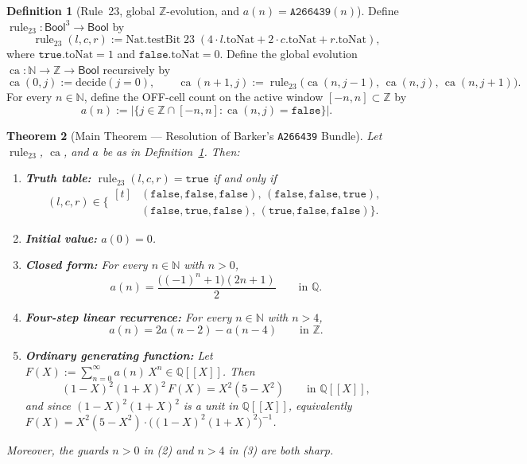 \documentclass[11pt]{article}
\newcommand{\llbracket}{[\![}
\newcommand{\rrbracket}{]\!]}
\newtheorem{theorem}{Theorem}[section]
\theoremstyle{definition}
\newtheorem{definition}[theorem]{Definition}
\newcommand{\N}{\mathbb{N}}
\newcommand{\Z}{\mathbb{Z}}
\newcommand{\Q}{\mathbb{Q}}
\newcommand{\seq}[1]{\texttt{#1}}
\newcommand{\ruleTT}{\operatorname{rule}_{23}}
\newcommand{\ca}{\operatorname{ca}}
\begin{document}
\begin{definition}[Rule~23, global $\Z$-evolution, and $a(n) = \seq{A266439}(n)$]
\label{def:c051}
Define $\ruleTT : \mathsf{Bool}^3 \to \mathsf{Bool}$ by
\[
\ruleTT(l, c, r) := \mathrm{Nat.testBit}\;23\;(4\cdot l.\mathrm{toNat} + 2\cdot c.\mathrm{toNat} + r.\mathrm{toNat}),
\]
where $\mathtt{true}.\mathrm{toNat} = 1$ and $\mathtt{false}.\mathrm{toNat} = 0$. Define the global evolution $\ca : \N \to \Z \to \mathsf{Bool}$ recursively by
\[
\ca(0, j) := \mathrm{decide}(j = 0), \qquad
\ca(n + 1, j) := \ruleTT\bigl(\ca(n, j - 1),\, \ca(n, j),\, \ca(n, j + 1)\bigr).
\]
For every $n \in \N$, define the OFF-cell count on the active window $[-n, n] \subset \Z$ by
\[
a(n) := \bigl|\{j \in \Z \cap [-n, n] : \ca(n, j) = \mathtt{false}\}\bigr|.
\]
\end{definition}

\begin{theorem}[Main Theorem --- Resolution of Barker's \seq{A266439} Bundle]
\label{thm:main}
Let $\ruleTT$, $\ca$, and $a$ be as in Definition~\ref{def:c051}. Then:
\begin{enumerate}
\item[\textup{(0)}] \textbf{Truth table:} $\ruleTT(l, c, r) = \mathtt{true}$ if and only if
\[
(l, c, r) \in \bigl\{\begin{aligned}[t]
&(\mathtt{false},\mathtt{false},\mathtt{false}),\, (\mathtt{false},\mathtt{false},\mathtt{true}),\\
&(\mathtt{false},\mathtt{true},\mathtt{false}),\, (\mathtt{true},\mathtt{false},\mathtt{false})\bigr\}.
\end{aligned}
\]
\item[\textup{(1)}] \textbf{Initial value:} $a(0) = 0$.
\item[\textup{(2)}] \textbf{Closed form:} For every $n \in \N$ with $n > 0$,
\[
a(n) = \frac{\bigl((-1)^n + 1\bigr)(2n + 1)}{2} \qquad \text{in }\Q.
\]
\item[\textup{(3)}] \textbf{Four-step linear recurrence:} For every $n \in \N$ with $n > 4$,
\[
a(n) = 2a(n - 2) - a(n - 4) \qquad \text{in }\Z.
\]
\item[\textup{(4)}] \textbf{Ordinary generating function:} Let $F(X) := \sum_{n=0}^{\infty} a(n)\,X^n \in \Q\llbracket X \rrbracket$. Then
\[
(1 - X)^2 (1 + X)^2 \, F(X) = X^2 (5 - X^2) \qquad \text{in }\Q\llbracket X \rrbracket,
\]
and since $(1 - X)^2(1 + X)^2$ is a unit in $\Q\llbracket X \rrbracket$, equivalently $F(X) = X^2(5 - X^2)\cdot \bigl((1 - X)^2(1 + X)^2\bigr)^{-1}$.
\end{enumerate}
Moreover, the guards $n > 0$ in \textup{(2)} and $n > 4$ in \textup{(3)} are both sharp.
\end{theorem}
\end{document}
